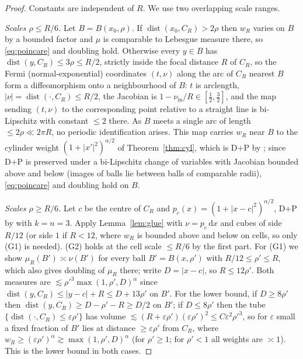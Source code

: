 \documentclass[11pt]{amsart}
\newcommand{\dd}{\,\mathrm{d}}
\newcommand{\abs}[1]{\lvert #1\rvert}
\DeclareMathOperator{\dist}{dist}
\theoremstyle{plain}
\theoremstyle{definition}
\theoremstyle{remark}
\begin{document}
\begin{proof}
Constants are independent of $R$. We use two overlapping scale ranges.

\emph{Scales $\rho\le R/6$.} Let $B=B(x_0,\rho)$. If $\dist(x_0,C_R)>2\rho$ then
$w_R$ varies on $B$ by a bounded factor and $\mu$ is comparable to Lebesgue
measure there, so \eqref{eq:poincare} and doubling hold. Otherwise every $y\in
B$ has $\dist(y,C_R)\le3\rho\le R/2$, strictly inside the focal distance $R$ of
$C_R$, so the Fermi (normal-exponential) coordinates $(t,\nu)$ along the arc of
$C_R$ nearest $B$ form a diffeomorphism onto a neighbourhood of $B$: $t$ is
arclength, $\abs\nu=\dist(\cdot,C_R)\le R/2$, the Jacobian is
$1-\nu_{\mathrm{in}}/R\in[\tfrac12,\tfrac32]$, and the map sending $(t,\nu)$ to
the corresponding point relative to a straight line is bi-Lipschitz with
constant $\le2$ there. As $B$ meets a single arc of length $\le2\rho\ll2\pi R$,
no periodic identification arises. This map carries $w_R$ near $B$ to the
cylinder weight $(1+\abs{x'}^2)^{\alpha/2}$ of Theorem~\ref{thm:cyl}, which is
D+P by \cite[Prop.~6]{bjorn2001}; since D+P is preserved under a bi-Lipschitz
change of variables with Jacobian bounded above and below (images of balls lie
between balls of comparable radii), \eqref{eq:poincare} and doubling hold on $B$.

\emph{Scales $\rho\ge R/6$.} Let $c$ be the centre of $C_R$ and
$p_c(x)=(1+\abs{x-c}^2)^{\alpha/2}$, D+P by \cite[Prop.~6]{bjorn2001} with
$k=n=3$. Apply Lemma~\ref{lem:glue} with $\nu=p_c\dd x$ and cubes of side $R/12$
(or side $1$ if $R<12$, where $w_R$ is bounded above and below on cells, so only
(G1) is needed). (G2) holds at the cell scale $\le R/6$ by the first part. For
(G1) we show $\mu_R(B')\asymp\nu(B')$ for every ball $B'=B(x,\rho')$ with
$R/12\le\rho'\le R$, which also gives doubling of $\mu_R$ there; write
$D=\abs{x-c}$, so $R\le12\rho'$. Both measures are
$\lesssim\rho'^3\max(1,\rho',D)^\alpha$ since $\dist(y,C_R)\le\abs{y-c}+R\le
D+13\rho'$ on $B'$. For the lower bound, if $D\ge8\rho'$ then
$\dist(y,C_R)\ge D-\rho'-R\ge D/2$ on $B'$; if $D\le8\rho'$ then the tube
$\{\dist(\cdot,C_R)\le\varepsilon\rho'\}$ has volume $\lesssim(R+\varepsilon
\rho')(\varepsilon\rho')^2\le C\varepsilon^2\rho'^3$, so for $\varepsilon$ small
a fixed fraction of $B'$ lies at distance $\ge\varepsilon\rho'$ from $C_R$, where
$w_R\ge(\varepsilon\rho')^\alpha\gtrsim\max(1,\rho',D)^\alpha$ (for $\rho'\ge1$;
for $\rho'<1$ all weights are $\asymp1$). This is the lower bound in both cases.
\end{proof}
\end{document}
